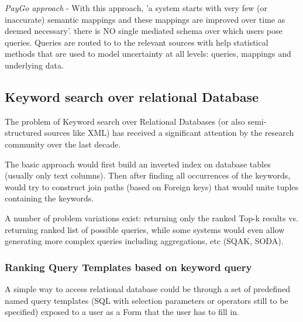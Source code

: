 \textit{PayGo approach}\cite{webscale_paygo}  - With this approach, 'a system starts with
very few (or inaccurate) semantic mappings and these mappings
are improved over time as deemed necessary'.
there is NO single mediated schema over which users pose queries. Queries are routed to to the relevant sources with help statistical methods that are used to model uncertainty at all levels: queries, mappings and underlying data. 




\subsection{Keyword search over relational Database}
The problem of Keyword search over Relational Databases (or also semi-structured sources like XML) has received a significant attention by the research community over the last decade. 

The basic approach would first build an inverted index on database tables (usually only text columns). Then after finding all occurrences of the keywords, would try to construct join paths (based on Foreign keys) that would unite tuples containing the keywords.

% 
A number of problem variations exist:  returning only the ranked Top-k results vs. returning ranked list of possible queries, while some systems would even allow generating more complex queries including aggregations, etc (SQAK, SODA\cite{ethz2012}).

\subsubsection*{Ranking Query Templates based on keyword query}
A simple way to access relational database could  be through a set of predefined named query templates (SQL with selection parameters or operators still to be specified) exposed to a user as a Form that the user has to fill in.

